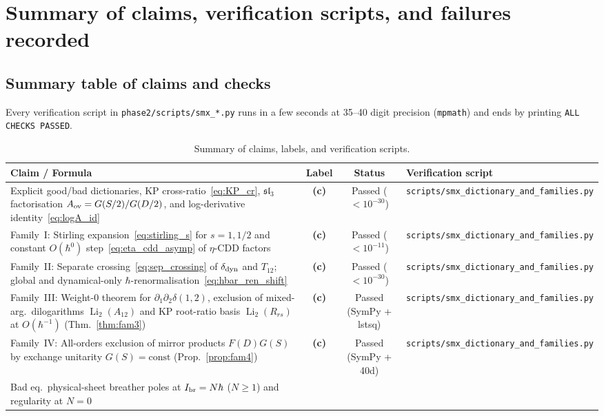 \documentclass[11pt,a4paper]{article}
\newcommand{\Lc}{\textsf{\textbf{(c)}}}
\newcommand{\smxdict}{\texttt{scripts/\allowbreak smx\_\allowbreak dictionary\_\allowbreak and\_\allowbreak families.py}}
\DeclareMathOperator{\Li}{Li}
\theoremstyle{remark}
\begin{document}
\section{Summary of claims, verification scripts, and failures recorded}\label{sec:summary}

\subsection{Summary table of claims and checks}
Every verification script in \texttt{phase2/scripts/smx\_*.py} runs in a few seconds at 35--40 digit precision (\texttt{mpmath}) and ends by printing \texttt{ALL CHECKS PASSED}.

\begin{table}[ht]
\centering\small
\caption{Summary of claims, labels, and verification scripts.}\label{tab:summary}
\begin{tabular}{@{}>{\raggedright\arraybackslash}p{7.1cm}cc>{\raggedright\arraybackslash}p{4.6cm}@{}}
\toprule
Claim / Formula & Label & Status & Verification script \\
\midrule
Explicit good/bad dictionaries, KP cross-ratio~\eqref{eq:KP_cr}, $\mathfrak{sl}_3$ factorisation $A_{\rm ov}=G(S/2)/G(D/2)$, and log-derivative identity~\eqref{eq:logA_id} &
\Lc & Passed ($<10^{-30}$) & \smxdict \\
\addlinespace[3pt]
Family~I: Stirling expansion~\eqref{eq:stirling_s} for $s=1,1/2$ and constant $O(\hbar^0)$ step~\eqref{eq:eta_cdd_asymp} of $\eta$-CDD factors &
\Lc & Passed ($<10^{-11}$) & \smxdict \\
\addlinespace[3pt]
Family~II: Separate crossing~\eqref{eq:sep_crossing} of $\delta_{\rm dyn}$ and $T_{12}$; global and dynamical-only $\hbar$-renormalisation~\eqref{eq:hbar_ren_shift} &
\Lc & Passed ($<10^{-30}$) & \smxdict \\
\addlinespace[3pt]
Family~III: Weight-0 theorem for $\partial_1\partial_2\delta(1,2)$, exclusion of mixed-arg.\ dilogarithms $\Li_2(A_{12})$ and KP root-ratio basis $\Li_2(R_{rs})$ at $O(\hbar^{-1})$ (Thm.~\ref{thm:fam3}) &
\Lc & Passed (SymPy + lstsq) & \smxdict \\
\addlinespace[3pt]
Family~IV: All-orders exclusion of mirror products $F(D)G(S)$ by exchange unitarity $G(S)=\text{const}$ (Prop.~\ref{prop:fam4}) &
\Lc & Passed (SymPy + 40d) & \smxdict \\
\addlinespace[3pt]
Bad eq.\ physical-sheet breather poles at $I_{\rm br}=N\hbar$ ($N\ge 1$) and regularity at $N=0$ &

\end{tabular}
\end{table}
\end{document}
